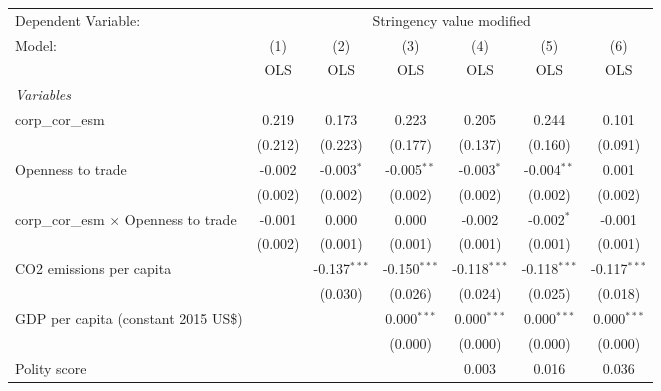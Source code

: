 
\begingroup
\centering
\begin{tabular}{lcccccc}
   \toprule
   Dependent Variable: & \multicolumn{6}{c}{Stringency value modified}\\
   Model:                                       & (1)     & (2)            & (3)            & (4)            & (5)            & (6)\\  
                                                &  OLS    & OLS            & OLS            & OLS            & OLS            & OLS\\  
   \midrule
   \emph{Variables}\\
   corp\_cor\_esm                               & 0.219   & 0.173          & 0.223          & 0.205          & 0.244          & 0.101\\   
                                                & (0.212) & (0.223)        & (0.177)        & (0.137)        & (0.160)        & (0.091)\\   
   Openness to trade                            & -0.002  & -0.003$^{*}$   & -0.005$^{**}$  & -0.003$^{*}$   & -0.004$^{**}$  & 0.001\\   
                                                & (0.002) & (0.002)        & (0.002)        & (0.002)        & (0.002)        & (0.002)\\   
   corp\_cor\_esm $\times$ Openness to trade    & -0.001  & 0.000          & 0.000          & -0.002         & -0.002$^{*}$   & -0.001\\   
                                                & (0.002) & (0.001)        & (0.001)        & (0.001)        & (0.001)        & (0.001)\\   
   CO2 emissions per capita                     &         & -0.137$^{***}$ & -0.150$^{***}$ & -0.118$^{***}$ & -0.118$^{***}$ & -0.117$^{***}$\\   
                                                &         & (0.030)        & (0.026)        & (0.024)        & (0.025)        & (0.018)\\   
   GDP per capita (constant 2015 US\$)          &         &                & 0.000$^{***}$  & 0.000$^{***}$  & 0.000$^{***}$  & 0.000$^{***}$\\   
                                                &         &                & (0.000)        & (0.000)        & (0.000)        & (0.000)\\   
   Polity score                                 &         &                &                & 0.003          & 0.016          & 0.036\\   

\end{tabular}
